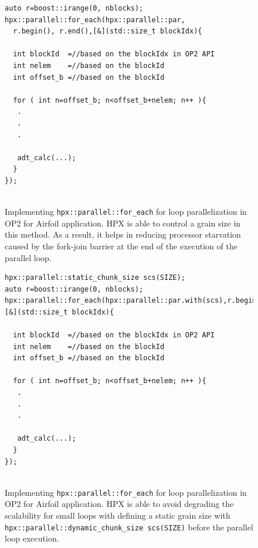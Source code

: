\documentclass[conference]{IEEEtran}
\begin{document}
\begin{figure} 
    \begin{lstlisting}    
auto r=boost::irange(0, nblocks);
hpx::parallel::for_each(hpx::parallel::par,
  r.begin(), r.end(),[&](std::size_t blockIdx){
  
  int blockId  =//based on the blockIdx in OP2 API
  int nelem    =//based on the blockId 
  int offset_b =//based on the blockId
        
  for ( int n=offset_b; n<offset_b+nelem; n++ ){
   .
   .
   .

   adt_calc(...);
  }
});
  
    \end{lstlisting}
    \caption{\small{Implementing \texttt{hpx::parallel::for\_each} for loop parallelization in OP2 for Airfoil application. HPX is able to control a grain size in this method. As a result, it helps in reducing processor starvation caused by the fork-join barrier at the end of the execution of the parallel loop.}}
    \label{l3}
\end{figure}

\begin{figure} 
    \begin{lstlisting}    
hpx::parallel::static_chunk_size scs(SIZE);
auto r=boost::irange(0, nblocks);
hpx::parallel::for_each(hpx::parallel::par.with(scs),r.begin(),r.end(),[&](std::size_t blockIdx){
  
  int blockId  =//based on the blockIdx in OP2 API
  int nelem    =//based on the blockId 
  int offset_b =//based on the blockId
        
  for ( int n=offset_b; n<offset_b+nelem; n++ ){
   .
   .
   .

   adt_calc(...);
  }
});
  
    \end{lstlisting}
    \caption{\small{Implementing \texttt{hpx::parallel::for\_each} for loop parallelization in OP2 for Airfoil application. HPX is able to avoid degrading the scalability for small loops with defining a static grain size with \texttt{hpx::parallel::dynamic\_chunk\_size scs(SIZE)} before the parallel loop execution.}}
    \label{l3b}
\end{figure}
\end{document}
